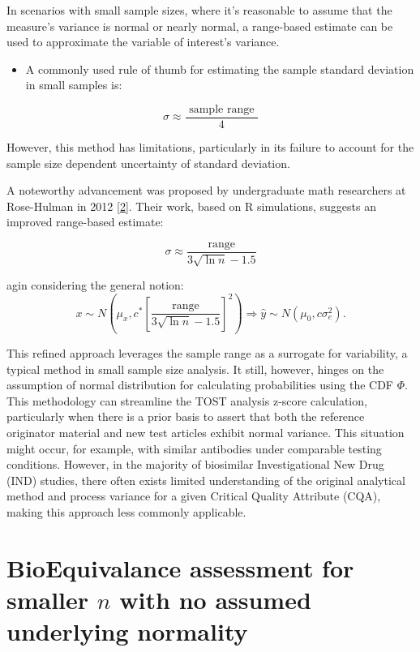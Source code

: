 \documentclass[
  12pt,
  a4paper,
]{article}
\providecommand{\tightlist}{%
  \setlength{\itemsep}{0pt}\setlength{\parskip}{0pt}}
\numberwithin{equation}{section}
\theoremstyle{plain}
\theoremstyle{definition}
\theoremstyle{remark}
\theoremstyle{note}
\begin{document}
In scenarios with small sample sizes, where it's reasonable to assume
that the measure's variance is normal or nearly normal, a range-based
estimate can be used to approximate the variable of interest's variance.

\begin{itemize}
\tightlist
\item
  A commonly used rule of thumb for estimating the sample standard
  deviation in small samples is:
\end{itemize}

\[
\sigma \approx \frac{\text { sample range }}{4}
\]

However, this method has limitations, particularly in its failure to
account for the sample size dependent uncertainty of standard deviation.

A noteworthy advancement was proposed by undergraduate math researchers
at Rose-Hulman in 2012
{[}\protect\hyperlink{ref-ramirez_improving_2012}{2}{]}. Their work,
based on R simulations, suggests an improved range-based estimate:

\[
\sigma \approx \frac{\text { range }}{3 \sqrt{\ln n}-1.5}
\]

agin considering the general notion: \[
x \sim N\left(\mu_x, c^* \left[\frac{\text { range }}{3 \sqrt{\ln n}-1.5} \right] ^2\right) \Longrightarrow \hat{y} \sim N\left(\mu_0, c \sigma_e^2\right) .
\]

This refined approach leverages the sample range as a surrogate for
variability, a typical method in small sample size analysis. It still,
however, hinges on the assumption of normal distribution for calculating
probabilities using the CDF \(\Phi\). This methodology can streamline
the TOST analysis z-score calculation, particularly when there is a
prior basis to assert that both the reference originator material and
new test articles exhibit normal variance. This situation might occur,
for example, with similar antibodies under comparable testing
conditions. However, in the majority of biosimilar Investigational New
Drug (IND) studies, there often exists limited understanding of the
original analytical method and process variance for a given Critical
Quality Attribute (CQA), making this approach less commonly applicable.

\newpage

\hypertarget{bioequivalance-assessment-for-smaller-n-with-no-assumed-underlying-normality}{%
\section{\texorpdfstring{BioEquivalance assessment for smaller \(n\)
with no assumed underlying
normality}{BioEquivalance assessment for smaller n with no assumed underlying normality}}\label{bioequivalance-assessment-for-smaller-n-with-no-assumed-underlying-normality}}
\end{document}

